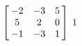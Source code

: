 {$\left[\hskip -3pt \begin{array}{ccc} -2&-3&5\\  5&2&0
\\  -1&-3&1\end{array}\hskip -3pt \right] $} 
{$1$}



  

